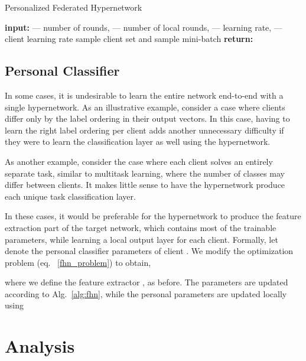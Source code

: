 \documentclass{article}
\def\eqref#1{eq. ~\ref{#1}}
\begin{document}
\begin{algorithm}[t]
    \caption{Personalized Federated Hypernetwork}\small\label{alg:fhn}
    \begin{algorithmic}[H]
    \State \textbf{input:}  --- number of rounds,  --- number of local rounds,  --- learning rate,  --- client learning rate
    \For{}
    \State sample client 
    \State set  and  
    \For{}
    \State sample mini-batch  
    \State 
    \EndFor
    \State 
    \State 
    \State 
    \EndFor
    \State \textbf{return:} 
    \end{algorithmic}
\end{algorithm}

\subsection{Personal Classifier}

In some cases, it is undesirable to learn the entire network end-to-end with a single hypernetwork. As an illustrative example, consider a case where clients differ only by the label ordering in their output vectors. In this case, having to learn the right label ordering per client adds another unnecessary  difficulty if they were to learn the classification layer as well using the hypernetwork.



As another example, consider the case where each client solves an entirely separate task, similar to multitask learning, where the number of classes may differ between clients. It makes little sense to have the hypernetwork produce each unique task classification layer. 

In these cases, it would be preferable for the hypernetwork to produce the feature extraction part of the target network, which contains most of the trainable parameters, while learning a local output layer for each client. Formally, let  denote the personal classifier parameters of client . We modify the optimization problem (\eqref{fhn_problem}) to obtain,

where we define the feature extractor , as before. The parameters  are updated according to Alg.~\ref{alg:fhn}, while the personal parameters  are updated locally using 



\section{Analysis}\label{sec:theory}
\end{document}
